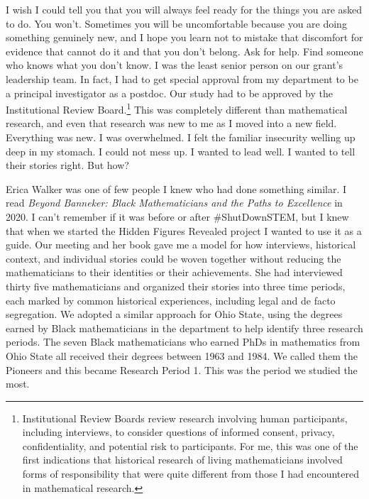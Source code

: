 \documentclass[pdflatex,sn-mathphys-num]{sn-jnl}%
\begin{document}
I wish I could tell you that you will always feel ready for the things you are asked to do. You won't. Sometimes you will be uncomfortable because you are doing something genuinely new, and I hope you learn not to mistake that discomfort for evidence that cannot do it and that you don't belong. Ask for help. Find someone who knows what you don't know. I was the least senior person on our grant's leadership team. In fact, I had to get special approval from my department to be a principal investigator as a postdoc. Our study had to be approved by the Institutional Review Board.\footnote{Institutional Review Boards review research involving human participants, including interviews, to consider questions of informed consent, privacy, confidentiality, and potential risk to participants. For me, this was one of the first indications that historical research of living mathematicians involved forms of responsibility that were quite different from those I had encountered in mathematical research.} This was completely different than mathematical research, and even that research was new to me as I moved into a new field. Everything was new. I was overwhelmed. I felt the familiar insecurity welling up deep in my stomach. I could not mess up. I wanted to lead well. I wanted to tell their stories right. But how? 

Erica Walker was one of few people I knew who had done something similar. I read \emph{Beyond Banneker: Black Mathematicians and the Paths to Excellence} \cite{walker2014beyond} in 2020. I can't remember if it was before or after \#ShutDownSTEM, but I knew that when we started the Hidden Figures Revealed project I wanted to use it as a guide. Our meeting and her book gave me a model for how interviews, historical context, and individual stories could be woven together without reducing the mathematicians to their identities or their achievements. She had interviewed thirty five mathematicians and organized their stories into three time periods, each marked by common historical experiences, including legal and de facto segregation. We adopted a similar approach for Ohio State, using the degrees earned by Black mathematicians in the department to help identify three research periods. The seven Black mathematicians who earned PhDs in mathematics from Ohio State all received their degrees between 1963 and 1984. We called them the Pioneers and this became Research Period 1. This was the period we studied the most.
\end{document}

